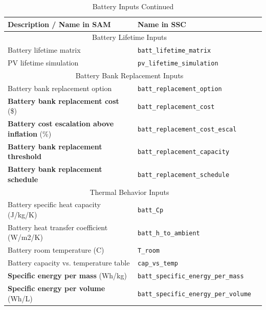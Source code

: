 \documentclass[12pt,letterpaper]{article}
\begin{document}
\begin{table}
\begin{center}
\caption{Battery Inputs Continued}
\begin{tabular}{lll}
\midrule
Description / \textbf{Name in SAM} & Name in SSC \\
\midrule
\multicolumn{2}{c}{Battery Lifetime Inputs}\\
Battery lifetime matrix & \texttt{batt\_lifetime\_matrix} \\
PV lifetime simulation & \texttt{pv\_lifetime\_simulation} \\
\midrule
\multicolumn{2}{c}{Battery Bank Replacement Inputs}\\
Battery bank replacement option & \texttt{batt\_replacement\_option} \\
\textbf{Battery bank replacement cost} (\$) & \texttt{batt\_replacement\_cost} \\
\textbf{Battery cost escalation above inflation} (\%) & \texttt{batt\_replacement\_cost\_escal} \\
\textbf{Battery bank replacement threshold} & \texttt{batt\_replacement\_capacity} \\
\textbf{Battery bank replacement schedule} & \texttt{batt\_replacement\_schedule} \\
\midrule
\multicolumn{2}{c}{Thermal Behavior Inputs}\\
Battery specific heat capacity (J/kg/K) & \texttt{batt\_Cp} \\
Battery heat transfer coefficient (W/m2/K)& \texttt{batt\_h\_to\_ambient} \\
Battery room temperature (C) & \texttt{T\_room} \\
Battery capacity vs. temperature table & \texttt{cap\_vs\_temp} \\
\textbf{Specific energy per mass} (Wh/kg) & \texttt{batt\_specific\_energy\_per\_mass} \\
\textbf{Specific energy per volume} (Wh/L) & \texttt{batt\_specific\_energy\_per\_volume} \\
\hline
\end{tabular}
\label{tab-batteryinputs2}
\end{center}
\end{table}
\end{document}

